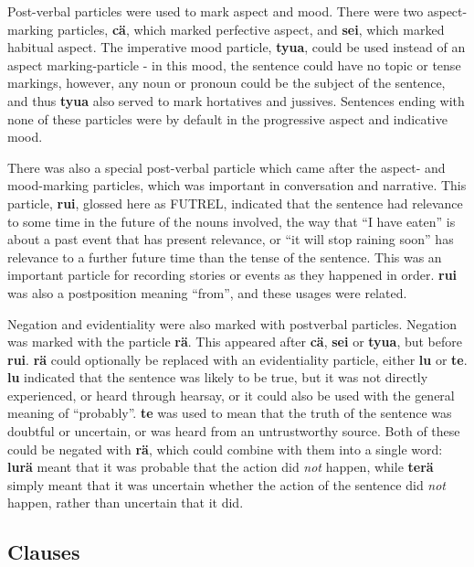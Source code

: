 \documentclass{article}
\begin{document}
Post-verbal particles were used to mark aspect and mood.  There were two aspect-marking particles, \textbf{c\"a}, which marked perfective aspect, and \textbf{sei}, which marked habitual aspect.  The imperative mood particle, \textbf{tyua}, could be used instead of an aspect marking-particle - in this mood, the sentence could have no topic or tense markings, however, any noun or pronoun could be the subject of the sentence, and thus \textbf{tyua} also served to mark hortatives and jussives.  Sentences ending with none of these particles were by default in the progressive aspect and indicative mood.

There was also a special post-verbal particle which came after the aspect- and mood-marking particles, which was important in conversation and narrative.  This particle, \textbf{rui}, glossed here as \textsc{FUTREL}, indicated that the sentence had relevance to some time in the future of the nouns involved, the way that ``I have eaten'' is about a past event that has present relevance, or ``it will stop raining soon'' has relevance to a further future time than the tense of the sentence.  This was an important particle for recording stories or events as they happened in order.  \textbf{rui} was also a postposition meaning ``from'', and these usages were related.

Negation and evidentiality were also marked with postverbal particles.  Negation was marked with the particle \textbf{r\"a}.  This appeared after \textbf{c\"a}, \textbf{sei} or \textbf{tyua}, but before \textbf{rui}.  \textbf{r\"a} could optionally be replaced with an evidentiality particle, either \textbf{lu} or \textbf{te}.  \textbf{lu} indicated that the sentence was likely to be true, but it was not directly experienced, or heard through hearsay, or it could also be used with the general meaning of ``probably''.  \textbf{te} was used to mean that the truth of the sentence was doubtful or uncertain, or was heard from an untrustworthy source.  Both of these could be negated with \textbf{r\"a}, which could combine with them into a single word: \textbf{lur\"a} meant that it was probable that the action did \emph{not} happen, while \textbf{ter\"a} simply meant that it was uncertain whether the action of the sentence did \emph{not} happen, rather than uncertain that it did.

\subsection{Clauses}
\end{document}

